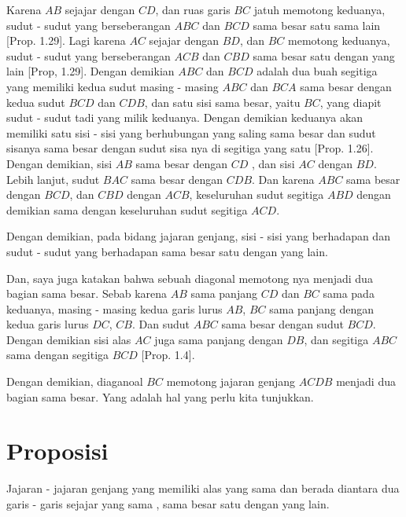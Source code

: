 \documentclass[a4paper]{book}
\begin{document}
Karena $AB$ sejajar dengan $CD$, dan ruas garis $BC$ jatuh memotong keduanya, 
sudut - sudut yang berseberangan $ABC$ dan $BCD$ sama besar satu sama lain 
[Prop. 1.29]. Lagi karena $AC$ sejajar dengan $BD$, dan $BC$ memotong keduanya, 
sudut - sudut yang berseberangan $ACB$ dan $CBD$ sama besar satu 
dengan yang lain [Prop, 1.29]. Dengan demikian $ABC$ dan $BCD$ adalah dua buah 
segitiga yang memiliki kedua sudut masing - masing $ABC$ dan $BCA$ sama besar 
dengan kedua sudut $BCD$ dan $CDB$, dan satu sisi sama besar, yaitu $BC$, yang
diapit sudut - sudut  tadi yang milik keduanya.
Dengan demikian keduanya akan memiliki satu sisi - sisi yang berhubungan yang saling
sama besar dan sudut sisanya sama besar dengan sudut sisa nya di segitiga yang satu
[Prop. 1.26].  Dengan demikian, sisi $AB$ sama besar dengan $CD$ , dan sisi 
$AC$ dengan $BD$. Lebih lanjut, sudut $BAC$ sama besar
dengan $CDB$. Dan karena $ABC$ sama besar dengan $BCD$, dan $CBD$ dengan $ACB$, 
keseluruhan sudut segitiga $ABD$ dengan demikian sama dengan keseluruhan  sudut 
segitiga $ACD$.

Dengan demikian, pada bidang jajaran genjang, sisi - sisi yang berhadapan dan
sudut - sudut yang berhadapan sama besar satu dengan yang lain.

Dan, saya juga katakan bahwa sebuah diagonal memotong nya menjadi dua bagian 
sama besar. Sebab karena $AB$ sama panjang $CD$ dan $BC$ sama pada keduanya,
 masing - masing 
kedua garis lurus $AB$, $BC$ sama panjang dengan kedua garis lurus $DC$, $CB$. 
Dan sudut $ABC$ sama besar dengan sudut $BCD$. Dengan demikian sisi alas $AC$ 
juga sama panjang dengan $DB$, dan segitiga $ABC$ sama dengan segitiga $BCD$ 
[Prop. 1.4].

Dengan demikian, diaganoal $BC$ memotong jajaran genjang $ACDB$ menjadi dua 
bagian sama besar. Yang adalah hal yang perlu kita tunjukkan.

\section*{\centering Proposisi \thesection} 
Jajaran - jajaran genjang yang memiliki alas yang sama dan berada diantara dua
garis - garis sejajar yang sama , sama besar satu dengan yang lain.  
\end{document}
